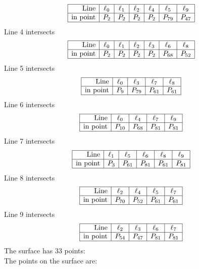 \documentclass{article}
\begin{document}
{$$\begin{array}{|r*{6}{|c}|}
\hline
\mbox{Line}  & \ell_{0} & \ell_{1} & \ell_{2} & \ell_{4} & \ell_{5} & \ell_{9}\\
\hline
\mbox{in point}  & P_{2} & P_{2} & P_{2} & P_{2} & P_{79} & P_{47}\\
\hline
\end{array}
$$
Line 4 intersects 
$$
\begin{array}{|r*{6}{|c}|}
\hline
\mbox{Line}  & \ell_{0} & \ell_{1} & \ell_{2} & \ell_{3} & \ell_{6} & \ell_{8}\\
\hline
\mbox{in point}  & P_{2} & P_{2} & P_{2} & P_{2} & P_{68} & P_{52}\\
\hline
\end{array}
$$
Line 5 intersects 
$$
\begin{array}{|r*{4}{|c}|}
\hline
\mbox{Line}  & \ell_{0} & \ell_{3} & \ell_{7} & \ell_{8}\\
\hline
\mbox{in point}  & P_{9} & P_{79} & P_{61} & P_{61}\\
\hline
\end{array}
$$
Line 6 intersects 
$$
\begin{array}{|r*{4}{|c}|}
\hline
\mbox{Line}  & \ell_{0} & \ell_{4} & \ell_{7} & \ell_{9}\\
\hline
\mbox{in point}  & P_{10} & P_{68} & P_{81} & P_{81}\\
\hline
\end{array}
$$
Line 7 intersects 
$$
\begin{array}{|r*{5}{|c}|}
\hline
\mbox{Line}  & \ell_{1} & \ell_{5} & \ell_{6} & \ell_{8} & \ell_{9}\\
\hline
\mbox{in point}  & P_{3} & P_{61} & P_{81} & P_{61} & P_{81}\\
\hline
\end{array}
$$
Line 8 intersects 
$$
\begin{array}{|r*{4}{|c}|}
\hline
\mbox{Line}  & \ell_{2} & \ell_{4} & \ell_{5} & \ell_{7}\\
\hline
\mbox{in point}  & P_{70} & P_{52} & P_{61} & P_{61}\\
\hline
\end{array}
$$
Line 9 intersects 
$$
\begin{array}{|r*{4}{|c}|}
\hline
\mbox{Line}  & \ell_{2} & \ell_{3} & \ell_{6} & \ell_{7}\\
\hline
\mbox{in point}  & P_{54} & P_{47} & P_{81} & P_{81}\\
\hline
\end{array}
$$
The surface has 33 points:\\
The points on the surface are:\\
}
\end{document}
